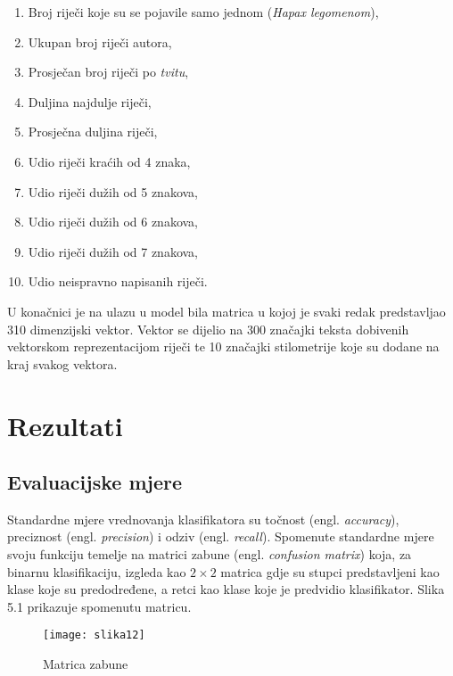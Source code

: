 \documentclass[times, utf8, zavrsni]{fer}
\begin{document}
\begin{enumerate}
	\item Broj riječi koje su se pojavile samo jednom (\textit{Hapax legomenom}),
	\item Ukupan broj riječi autora,
	\item Prosječan broj riječi po \textit{tvitu},
	\item Duljina najdulje riječi,
	\item Prosječna duljina riječi,
	\item Udio riječi kraćih od 4 znaka,
	\item Udio riječi dužih od 5 znakova,
	\item Udio riječi dužih od 6 znakova,
	\item Udio riječi dužih od 7 znakova,
	\item Udio neispravno napisanih riječi.
\end{enumerate}

U konačnici je na ulazu u model bila matrica u kojoj je svaki redak predstavljao 310 dimenzijski vektor. Vektor se dijelio na 300 značajki teksta dobivenih vektorskom reprezentacijom riječi te 10 značajki stilometrije koje su dodane na kraj svakog vektora.

\chapter{Rezultati}

\section{Evaluacijske mjere}

 Standardne mjere vrednovanja klasifikatora su točnost (engl. \textit{accuracy}), preciznost (engl. \textit{precision}) i odziv (engl. \textit{recall}). Spomenute standardne mjere svoju funkciju temelje na matrici zabune (engl. \textit{confusion matrix}) koja, za binarnu klasifikaciju, izgleda kao $2\times2$ matrica gdje su stupci predstavljeni kao klase koje su predodređene, a retci kao klase koje je predvidio klasifikator. Slika 5.1 prikazuje spomenutu matricu. 

\begin{figure}[h]
	\centering
	\texttt{[image: slika12]}
	\caption{Matrica zabune \protect\footnotemark}
\end{figure}

\end{document}
